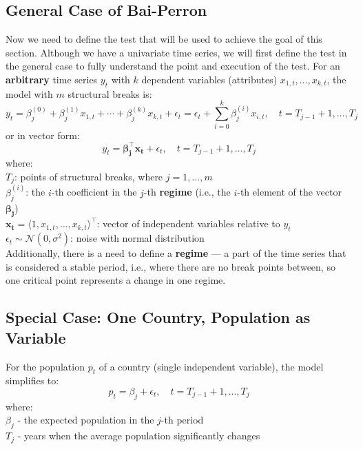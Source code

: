 \documentclass[a4paper,11pt]{article}
\begin{document}
\subsection{General Case of Bai-Perron}
Now we need to define the test that will be used to achieve the goal of this section. Although we have a univariate time series, we will first define the test in the general case to fully understand the point and execution of the test. For an \textbf{arbitrary} time series $y_t$ with $k$ dependent variables (attributes) $x_{1,t},...,x_{k,t}$, the model with $m$ structural breaks is:
$$
y_t = \beta_j^{(0)} + \beta_j^{(1)}x_{1,t} + \cdots + \beta_j^{(k)}x_{k,t} + \epsilon_t = \epsilon_t + \sum_{i=0}^{k} \beta_j^{(i)} x_{i,t}, \quad t = T_{j-1} + 1, \ldots, T_j
$$
or in vector form:
$$
y_t = \boldsymbol{\beta_j^\top x_t} + \epsilon_t, \quad t = T_{j-1} + 1, \ldots, T_j
$$
where: \\
\hspace{10pt} $T_j$: points of structural breaks, where $j = 1, \ldots, m$ \\
\hspace{10pt} $\beta_j^{(i)}$: the $i$-th coefficient in the $j$-th \textbf{regime} (i.e., the $i$-th element of the vector $\boldsymbol{\beta_j}$) \\
\hspace{10pt} $\boldsymbol{x_t} = \langle 1, x_{1,t}, \dots, x_{k,t}\rangle^\top$: vector of independent variables relative to $y_t$\\
\hspace{10pt} $\epsilon_t \sim \mathcal{N}(0, \sigma^2)$: noise with normal distribution \\
Additionally, there is a need to define a \textbf{regime} — a part of the time series that is considered a stable period, i.e., where there are no break points between, so one critical point represents a change in one regime.
\subsection{Special Case: One Country, Population as Variable}
For the population $p_t$ of a country (single independent variable), the model simplifies to:
\begin{equation}
p_t = \beta_j + \epsilon_t, \quad t=T_{j-1}+1,...,T_j
\end{equation}
where: \\
\hspace{10pt} $\beta_j$ - the expected population in the $j$-th period \\
\hspace{10pt} $T_j$ - years when the average population significantly changes
\end{document}
